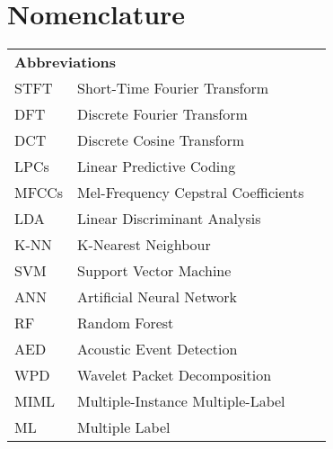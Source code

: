 

\chapter*{Nomenclature}

\begin{nomenc}
{
\renewcommand{\arraystretch}{1.2} 
\begin{longtable}{llr}
\multicolumn{3}{l}{\textbf{Abbreviations}\hspace{0.4\textwidth}~~}\\
STFT & Short-Time Fourier Transform \\
DFT   &                    Discrete Fourier Transform \\
DCT    &                    Discrete Cosine Transform \\
LPCs	 &                   Linear Predictive Coding \\
MFCCs &	       Mel-Frequency Cepstral Coefficients \\
LDA      &                  Linear Discriminant Analysis \\
K-NN	  &                  K-Nearest Neighbour \\
SVM	     &               Support Vector Machine \\
ANN    &                   Artificial Neural Network \\
RF     &                      Random Forest \\
AED	   &                 Acoustic Event Detection \\
WPD     &                 Wavelet Packet Decomposition \\
MIML   &                 Multiple-Instance Multiple-Label  \\ 
ML    &                      Multiple Label \\


\end{longtable}}
\end{nomenc}
